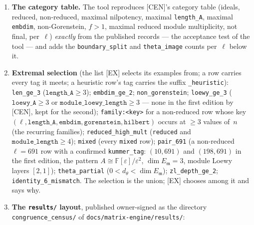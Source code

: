 \documentclass[11pt]{article}
\theoremstyle{remark}
\newcommand{\F}{\mathbb{F}}
\newcommand{\m}{\mathfrak{m}}
\begin{document}
\begin{enumerate}[label=(\alph*)]
\begin{center}
  \end{center}
  and the $\theta$ producer prints the \texttt{THETA\_IMAGE} lines of \S\ref{sec:thetaobj}~(f).
  \emph{Matching}: a run's block is the record's ideal iff its \texttt{witness\_poly} and its
  restricted \texttt{t\_p} matrices equal the record's (the pipeline and driver are deterministic,
  so equality is exact); the matching must be one-to-one on every cell, and a block or ideal left
  unmatched is a \textbf{finding} that stops the cell, never a nearest guess.
\item \textbf{The category table.} The tool reproduces [CEN]'s category table (ideals, reduced,
  non-reduced, maximal nilpotency, maximal \texttt{length\_A}, maximal \texttt{embdim},
  non-Gorenstein, $f>1$, maximal reduced module multiplicity, not final, per~$\ell$) \emph{exactly}
  from the published records --- the acceptance test of the tool --- and adds the
  \texttt{boundary\_split} and \texttt{theta\_image} counts per~$\ell$ below it.
\item \textbf{Extremal selection} (the list [EX] selects its examples from; a row carries every tag
  it meets; a heuristic row's tag carries the suffix \texttt{\_heuristic}):
  \texttt{len\_ge\_3} ($\texttt{length\_A}\ge3$); \texttt{embdim\_ge\_2};
  \texttt{non\_gorenstein}; \texttt{loewy\_ge\_3} ($\texttt{loewy\_A}\ge3$ or
  $\texttt{module\_loewy\_length}\ge3$ --- none in the first edition by [CEN], kept for the second);
  \texttt{family:<key>} for a non-reduced row whose key
  $(\ell,\texttt{length\_A},\texttt{embdim},\texttt{gorenstein},\texttt{hilbert})$ occurs at $\ge3$
  values of~$n$ (the recurring families); \texttt{reduced\_high\_mult} (\texttt{reduced} and
  $\texttt{module\_length}\ge4$); \texttt{mixed} (every \texttt{mixed} row); \texttt{pair\_691}
  (a non-reduced $\ell=691$ row with a confirmed \texttt{kummer\_tag}: $(10,691)$ and $(198,691)$ in
  the first edition, the pattern $A\cong\F[\varepsilon]/\varepsilon^2$, $\dim E_\m=3$, module Loewy
  layers $[2,1]$); \texttt{theta\_partial} ($0<d_\theta<\dim E_\m$); \texttt{zl\_depth\_ge\_2};
  \texttt{identity\_6\_mismatch}. The selection is the union; [EX] chooses among it and says why.
\item \textbf{The \texttt{results/} layout}, published owner-signed as the directory
  \texttt{congruence\_census/} of \texttt{docs/matrix-engine/results/}:
  \begin{center}\footnotesize
  \begin{tabular}{@{}>{\raggedright\arraybackslash}p{4.3cm}>{\raggedright\arraybackslash}p{9.6cm}@{}}

\end{tabular}
\end{center}
\end{enumerate}
\end{document}
